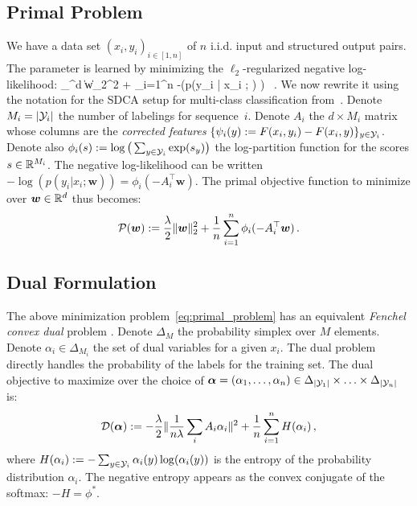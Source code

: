 \subsection{Primal Problem}
We have a data set $(x_i, y_i)_{i \in [1,n]}$ of $n$ i.i.d. input and structured output pairs.
The parameter is learned by minimizing the $\ell_2$-regularized negative log-likelihood:
\beq\label{negative log-likelihood}
\min_{\bw \in \real^d} \: \| \bm w\|_2^2 +  \sum_{i=1}^{n} -\log\left(p(y_i | x_i ; \bw) \right) \, .
\eeq
We now rewrite it using the notation for the SDCA setup for multi-class classification from~\citet{shalev2016accelerated}.
Denote $M_i = |{\mathcal Y}_i|$ the number of labelings for sequence~$i$.
Denote $A_i$ the $d \times M_i$ matrix whose columns are the \textit{corrected features} $\{\psi_i(y) := F(x_i, y_i) - F(x_i, y)\}_{y \in {\mathcal Y}_i}$.
Denote also $\phi_i(s) := \log \big(\sum_{y \in {\mathcal Y}_i} \exp(s_y)\big)$ the log-partition function for the scores $s \in \mathbb{R}^{M_i}$. The negative log-likelihood can be written $-\log(p(y_i|x_i ;\bm w)) = \phi_i(-A_i^{\top} \bm w)$. The primal objective function to minimize over $\bm w \in \mathbb{R}^d$ thus  becomes:
\begin{equation}
	\label{eq:primal_problem}
	{\mathcal P}(\bm w) := \frac{\lambda}{2}\| \bm w\|_2^2
	+ \frac{1}{n}   \sum_{i=1}^{n} \phi_i(-A_i^{\top} \bm w) \, .
\end{equation}

\subsection{Dual Formulation}
The above minimization problem~\eqref{eq:primal_problem} has an equivalent {\it Fenchel convex dual} problem \citep{lebanon2002boosting}.
Denote $\Delta_{M}$ the probability simplex over $M$ elements.
Denote $\alpha_i \in \Delta_{M_i}$ the set of dual variables for a given $x_i$.
The dual problem directly handles the probability of the labels for the training set.
The dual objective to maximize over the choice of $\boldsymbol{\alpha} = (\alpha_1, \ldots, \alpha_n) \in \Delta_{|{\mathcal Y}_1|} \times \ldots \times \Delta_{|{\mathcal Y}_n|} $ is:
\begin{equation}
	\label{dual problem}
	{\mathcal D}(\boldsymbol{\alpha}) := -\frac{\lambda}{2} \| \frac{1}{n \lambda} \sum_i A_i \alpha_i \|^2
	+ \frac{1}{n} \sum_{i=1}^n H(\alpha_i) \, ,
\end{equation}
where $H(\alpha_i) := - \sum_{y \in {\mathcal Y}_i} \alpha_i(y) \log(\alpha_i(y))$ is the entropy of the probability distribution $\alpha_i$. The negative entropy appears as the convex conjugate of the softmax: $-H = \phi^*$.


